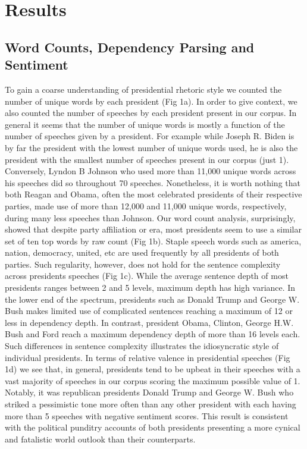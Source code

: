 \documentclass{article}
\begin{document}
{\section{Results}{
	
\subsection{Word Counts, Dependency Parsing and Sentiment}{To gain a coarse understanding of presidential rhetoric style we counted the number of unique words by each president (Fig 1a). In order to give context, we also counted the number of speeches by each president present in our corpus. In general it seems that the number of unique words is mostly a function of the number of speeches given by a president. For example while Joseph R. Biden is by far the president with the lowest number of unique words used, he is also the president with the smallest number of speeches present in our corpus (just 1). Conversely, Lyndon B Johnson who used more than 11,000 unique words across his speeches did so throughout 70 speeches. Nonetheless, it is worth nothing that both Reagan and Obama, often the most celebrated presidents of their respective parties, made use of more than 12,000 and 11,000 unique words, respectively, during many less speeches than Johnson. 
Our word count analysis, surprisingly, showed that despite party affiliation or era, most presidents seem to use a similar set of ten top words by raw count (Fig 1b). Staple speech words such as america, nation, democracy, united, etc are used frequently by all presidents of both parties. Such regularity, however, does not hold for the sentence complexity across presidents speeches (Fig 1c).  While the average sentence depth of most presidents ranges between 2 and 5 levels, maximum depth has high variance. In the lower end of the spectrum, presidents such as Donald Trump and George W. Bush makes limited use of complicated sentences reaching a maximum of 12 or less in dependency depth. In contrast, president Obama, Clinton, George H.W. Bush and Ford reach a maximum dependency depth of more than 16 levels each. Such differences in sentence complexity illustrates the idiosyncratic style of individual presidents.
In terms of relative valence in presidential speeches (Fig 1d) we see that, in general, presidents tend to be upbeat in their speeches with a vast majority of speeches in our corpus scoring the maximum possible value of 1. Notably, it was republican presidents Donald Trump and George W. Bush who striked a pessimistic tone more often than any other president with each having more than 5 speeches with negative sentiment scores. This result is consistent with the political punditry accounts of both presidents presenting a more cynical and fatalistic world outlook than their counterparts.

}}}
\end{document}

